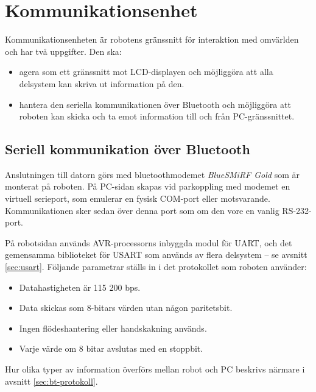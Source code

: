 \section{Kommunikationsenhet}
Kommunikationsenheten är robotens gränssnitt för interaktion med omvärlden och har två uppgifter. Den ska:
\begin{itemize}
\item agera som ett gränssnitt mot LCD-displayen och möjliggöra att alla delsystem kan skriva ut information på den.
\item hantera den seriella kommunikationen över Bluetooth och möjliggöra att roboten kan skicka och ta emot information till och från PC-gränssnittet.
\end{itemize}

\subsection{Seriell kommunikation över Bluetooth}
Anslutningen till datorn görs med bluetoothmodemet \emph{BlueSMiRF Gold} som är monterat på roboten. På PC-sidan skapas vid parkoppling med modemet en virtuell serieport, som emulerar en fysisk COM-port eller motsvarande. Kommunikationen sker sedan över denna port som om den vore en vanlig RS-232-port. 

På robotsidan används AVR-processorns inbyggda modul för UART, och det gemensamma biblioteket för USART som används av flera delsystem -- se avsnitt \ref{sec:usart}. Följande parametrar ställs in i det protokollet som roboten använder:
\begin{itemize}
\item Datahastigheten är 115 200 bps.
\item Data skickas som 8-bitars värden utan någon paritetsbit.
\item Ingen flödeshantering eller handskakning används.
\item Varje värde om 8 bitar avslutas med en stoppbit.
\end{itemize}

Hur olika typer av information överförs mellan robot och PC beskrivs närmare i avsnitt \ref{sec:bt-protokoll}.
